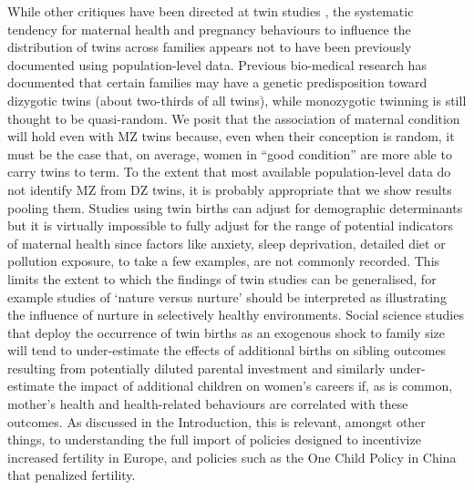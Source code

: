 \documentclass[11pt]{article}
\begin{document}
While other critiques have been directed at twin studies \cite{RosenzweigZhang2009}, the systematic tendency for maternal health and pregnancy behaviours to influence the distribution of twins across families appears not to have been previously documented using population-level data. 
Previous bio-medical research has documented that certain families may have a genetic predisposition toward dizygotic twins (about two-thirds of all twins), while monozygotic twinning is still thought to be quasi-random. We posit that the association of maternal condition will hold even with MZ twins because, even when their conception is random, it must be the case that, on average, women in ``good condition'' are more able to carry twins to term. To the extent that most available population-level data do not identify MZ from DZ twins, it is probably appropriate that we show results pooling them.
Studies using twin births can adjust for demographic determinants but it is virtually impossible to fully adjust for the range of potential indicators of maternal health since factors like anxiety, sleep deprivation, detailed diet or pollution exposure, to take a few examples, are not commonly recorded. This limits the extent to which the findings of twin studies can be generalised, for example studies of `nature versus nurture' should be interpreted as illustrating the influence of nurture in selectively healthy environments. Social science studies that deploy the occurrence of twin births as an exogenous shock to family size will tend to under-estimate the effects of additional births on sibling outcomes resulting from potentially diluted parental investment and similarly under-estimate the impact of additional children on women's careers if, as is common, mother's health and health-related behaviours are correlated with these outcomes. As discussed in the Introduction, this is relevant, amongst other things, to understanding the full import of policies designed to incentivize increased fertility in Europe, and policies such as the One Child Policy in China that penalized fertility.
\end{document}
